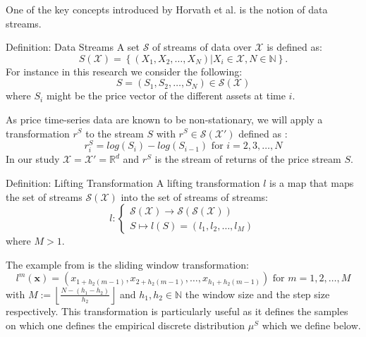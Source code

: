 \documentclass[12pt,a4paper]{report}
\begin{document}
One of the key concepts introduced by Horvath et al. \cite{HorvathEtAl2024} is the notion of data streams.
\begin{paragraph}{Definition: Data Streams}
A set $\mathcal{S}$ of streams of data over $\mathcal{X}$ is defined as: $$S(\mathcal{X}) = \left\{(X_1, X_2, \dots, X_N) | X_i \in \mathcal{X}, N \in \mathbb{N} \right\}.$$ 
For instance in this research we consider the following: 
\begin{equation}
    S = (S_1, S_2, \dots, S_N) \in \mathcal{S}(\mathcal{X})
\end{equation}
where $S_i$ might be the price vector of the different assets at time $i$.
\cite{HorvathEtAl2024}
\end{paragraph}

As price time-series data are known to be non-stationary, we will apply a transformation $r^{S}$ to the stream $S$ with $r^{S} \in \mathcal{S}(\mathcal{X}')$ defined as :
\begin{equation}
r^{S}_{i} = log(S_{i}) - log(S_{i-1}) \text{ for } i = 2, 3, \dots, N
\end{equation}
In our study $\mathcal{X} = \mathcal{X}' = \mathbb{R}^d$ and $r^{S}$ is the stream of returns of the price stream $S$.

\begin{paragraph}{Definition: Lifting Transformation}
A lifting transformation $l$ is a map that maps the set of streams $\mathcal{S}(\mathcal{X})$ into the set of streams of streams: 
\begin{equation}
l: \left\{
\begin{aligned}
\mathcal{S}(\mathcal{X}) \rightarrow \mathcal{S}(\mathcal{S}(\mathcal{X})) \\ 
S \mapsto l(S) = (l_1, l_2, \dots, l_M)
\end{aligned}
\right.
\end{equation}
where $M>1$.  \cite{HorvathEtAl2024}
\end{paragraph}

The example from \cite{BonnierKidger2019} is the sliding window transformation: 
\begin{equation}
    l^m(\mathbf{x}) = (x_{1+h_2 (m-1)}, x_{2+h_2 (m-1)}, \dots, x_{h_1+h_2 (m-1)}) \text{ for } m = 1, 2, \dots, M
\end{equation}
with $M := \left\lfloor\frac{N-\left(h_1-h_2\right)}{h_2}\right\rfloor$ and $h_1, h_2 \in \mathbb{N}$ the window size and the step size respectively.
This transformation is particularly useful as it defines the samples on which one defines the empirical discrete distribution $\mu^S$ which we define below. 
\end{document}
